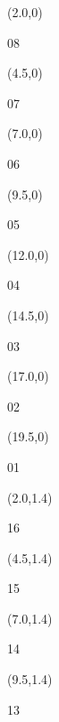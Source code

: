 \documentclass[a4paper]{article}
\newcommand{\myseat}[4]{%
\vspace{-0.1cm} \hspace{-0.5cm}
\parbox[t][2.2cm][t]{3.5cm}{%
\small #1 %
\begin{description}
\vspace{-0.1cm}
\item [ID:] #2
\vspace{-0.1cm}
\item [Team:] #3 \normalsize
\vspace{-0.1cm}
\item \normalsize #4
\vspace{-0.1cm}
\end{description}
}
}
\begin{document}
\begin{textblock}{2.5}(2.0,0)
\textblockcolor{}
\myseat{08}{}{}{}
\end{textblock}

\begin{textblock}{2.5}(4.5,0)
\textblockcolor{}
\myseat{07}{}{}{}
\end{textblock}

\begin{textblock}{2.5}(7.0,0)
\textblockcolor{}
\myseat{06}{}{}{}
\end{textblock}

\begin{textblock}{2.5}(9.5,0)
\textblockcolor{}
\myseat{05}{}{}{}
\end{textblock}

\begin{textblock}{2.5}(12.0,0)
\textblockcolor{}
\myseat{04}{}{}{}
\end{textblock}

\begin{textblock}{2.5}(14.5,0)
\textblockcolor{}
\myseat{03}{}{}{}
\end{textblock}

\begin{textblock}{2.5}(17.0,0)
\textblockcolor{}
\myseat{02}{}{}{}
\end{textblock}

\begin{textblock}{2.5}(19.5,0)
\textblockcolor{}
\myseat{01}{}{}{}
\end{textblock}


\begin{textblock}{2.5}(2.0,1.4)
\textblockcolor{}
\myseat{16}{}{}{}
\end{textblock}

\begin{textblock}{2.5}(4.5,1.4)
\textblockcolor{}
\myseat{15}{}{}{}
\end{textblock}

\begin{textblock}{2.5}(7.0,1.4)
\textblockcolor{}
\myseat{14}{}{}{}
\end{textblock}

\begin{textblock}{2.5}(9.5,1.4)
\textblockcolor{}
\myseat{13}{}{}{}
\end{textblock}
\end{document}
